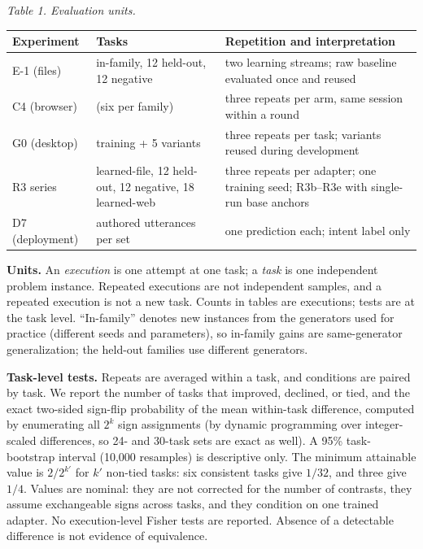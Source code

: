 \documentclass[
  10pt,
]{article}
\newcounter{none} %
\begin{document}
\emph{Table 1. Evaluation units.}

{\def\LTcaptype{none} %
\begin{longtable}[]{@{}
  >{\raggedright\arraybackslash}p{}
  >{\raggedright\arraybackslash}p{}
  >{\raggedright\arraybackslash}p{}@{}}
\toprule\noalign{}
\begin{minipage}[b]{\linewidth}\raggedright
Experiment
\end{minipage} & \begin{minipage}[b]{\linewidth}\raggedright
Tasks
\end{minipage} & \begin{minipage}[b]{\linewidth}\raggedright
Repetition and interpretation
\end{minipage} \\
\midrule\noalign{}
\endhead
\bottomrule\noalign{}
\endlastfoot
E-1 (files) & 24 in-family, 12 held-out, 12 negative & two learning
streams; raw baseline evaluated once and reused \\
C4 (browser) & 30 (six per family) & three repeats per arm, same session
within a round \\
G0 (desktop) & 10 training + 5 variants & three repeats per task;
variants reused during development \\
R3 series & 24 learned-file, 12 held-out, 12 negative, 18 learned-web &
three repeats per adapter; one training seed; R3b--R3e with single-run
base anchors \\
D7 (deployment) & 30 authored utterances per set & one prediction each;
intent label only \\
\end{longtable}
}

\textbf{Units.} An \emph{execution} is one attempt at one task; a
\emph{task} is one independent problem instance. Repeated executions are
not independent samples, and a repeated execution is not a new task.
Counts in tables are executions; tests are at the task level.
``In-family'' denotes new instances from the generators used for
practice (different seeds and parameters), so in-family gains are
same-generator generalization; the held-out families use different
generators.

\textbf{Task-level tests.} Repeats are averaged within a task, and
conditions are paired by task. We report the number of tasks that
improved, declined, or tied, and the exact two-sided sign-flip
probability of the mean within-task difference, computed by enumerating
all \(2^k\) sign assignments (by dynamic programming over integer-scaled
differences, so 24- and 30-task sets are exact as well). A 95\%
task-bootstrap interval (10,000 resamples) is descriptive only. The
minimum attainable value is \(2/2^{k'}\) for \(k'\) non-tied tasks: six
consistent tasks give \(1/32\), and three give \(1/4\). Values are
nominal: they are not corrected for the number of contrasts, they assume
exchangeable signs across tasks, and they condition on one trained
adapter. No execution-level Fisher tests are reported. Absence of a
detectable difference is not evidence of equivalence.
\end{document}
